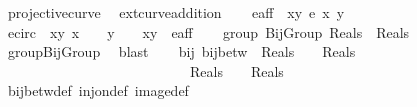 \begin{isabellebody}
\isanewline
%
\endisadelimproof
\isanewline
\isanewline
{}\isamarkupfalse%
\isanewline
\isanewline
{}\isamarkupfalse%
\ projective{\isacharunderscore}curve\ {\isacharequal}\isanewline
\ ext{\isacharunderscore}curve{\isacharunderscore}addition\isanewline
{}\isanewline
\ \ \isamarkupfalse%
\ {\isachardoublequoteopen}e{\isacharunderscore}aff\ {\isacharequal}\ {\isacharbraceleft}{\isacharparenleft}x{\isacharcomma}y{\isacharparenright}{\isachardot}\ e{\isacharprime}\ x\ y\ {\isacharequal}\ {}{\isacharbraceright}{\isachardoublequoteclose}\ \isanewline
\ \ \isamarkupfalse%
\ {\isachardoublequoteopen}e{\isacharunderscore}circ\ {\isacharequal}\ {\isacharbraceleft}{\isacharparenleft}x{\isacharcomma}y{\isacharparenright}{\isachardot}\ x\ {\isasymnoteq}\ {}\ {\isasymand}\ y\ {\isasymnoteq}\ {}\ {\isasymand}\ {\isacharparenleft}x{\isacharcomma}y{\isacharparenright}\ {\isasymin}\ e{\isacharunderscore}aff{\isacharbraceright}{\isachardoublequoteclose}\isanewline
\isanewline
\ \ \isamarkupfalse%
\ {\isachardoublequoteopen}group\ {\isacharparenleft}BijGroup\ {\isacharparenleft}Reals\ {\isasymtimes}\ Reals{\isacharparenright}{\isacharparenright}{\isachardoublequoteclose}\isanewline
%
\isadelimproof
\ \ \ \ %
\endisadelimproof
%
\isatagproof
{}\isamarkupfalse%
\ group{\isacharunderscore}BijGroup\ \isamarkupfalse%
\ blast%
\endisatagproof
{\isafoldproof}%
%
\isadelimproof
\isanewline
%
\endisadelimproof
\isanewline
\ \ \isamarkupfalse%
\ bij{\isacharunderscore}{\isasymrho}{\isacharcolon}\ {\isachardoublequoteopen}bij{\isacharunderscore}betw\ {\isasymrho}\ {\isacharparenleft}{\isacharparenleft}Reals\ {\isacharminus}\ {\isacharbraceleft}{}{\isacharbraceright}{\isacharparenright}\ {\isasymtimes}\ {\isacharparenleft}Reals\ {\isacharminus}\ {\isacharbraceleft}{}{\isacharbraceright}{\isacharparenright}{\isacharparenright}\ \isanewline
\ \ \ \ \ \ \ \ \ \ \ \ \ \ \ \ \ \ \ \ \ \ \ \ \ \ \ {\isacharparenleft}{\isacharparenleft}Reals\ {\isacharminus}\ {\isacharbraceleft}{}{\isacharbraceright}{\isacharparenright}\ {\isasymtimes}\ {\isacharparenleft}Reals\ {\isacharminus}\ {\isacharbraceleft}{}{\isacharbraceright}{\isacharparenright}{\isacharparenright}{\isachardoublequoteclose}\isanewline
%
\isadelimproof
\ \ \ \ %
\endisadelimproof
%
\isatagproof
{}\isamarkupfalse%
\ bij{\isacharunderscore}betw{\isacharunderscore}def\ inj{\isacharunderscore}on{\isacharunderscore}def\ image{\isacharunderscore}def\isanewline

\end{isabellebody}
